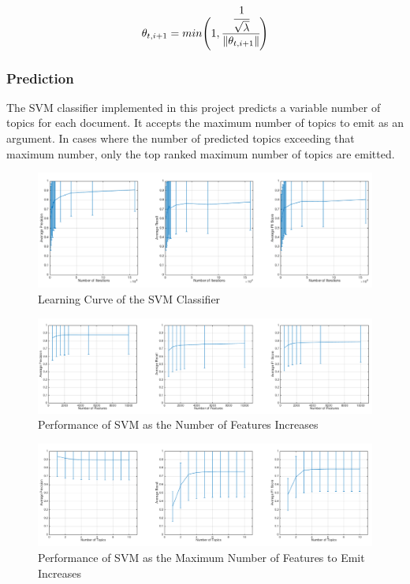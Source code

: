 \documentclass[11pt]{article}
\begin{document}
\begin{equation}
    \label{eq:svm-projection}
    \begin{split}
        \theta_{t, i+1} = min\Bigg(1, \cfrac{\cfrac{1}{\sqrt{\lambda}}}{\left\lVert \theta_{t, i+1} \right\rVert} \Bigg)
    \end{split}
\end{equation}

\subsubsection*{Prediction}
The SVM classifier implemented in this project predicts a variable number of topics for each document.
It accepts the maximum number of topics to emit as an argument.
In cases where the number of predicted topics exceeding that maximum number, only the top ranked maximum number of topics are emitted.

\begin{figure}
\centering
    \centering
    \includegraphics[width=1\textwidth]{svm-num-of-iterations.png}
    \caption{Learning Curve of the SVM Classifier}
    \label{fig:svm-num-of-iterations}
\end{figure}

\begin{figure}
\centering
    \centering
    \includegraphics[width=1\textwidth]{svm-num-of-features.png}
    \caption{Performance of SVM as the Number of Features Increases}
    \label{fig:svm-num-of-features}
\end{figure}

\begin{figure}
\centering
    \centering
    \includegraphics[width=1\textwidth]{svm-num-of-topics}
    \caption{Performance of SVM as the Maximum Number of Features to Emit Increases}
    \label{fig:svm-num-of-topics}
\end{figure}
\end{document}
